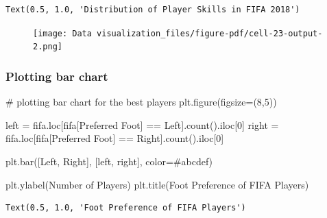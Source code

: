 \documentclass[
  letterpaper,
  DIV=11,
  numbers=noendperiod]{scrreprt}
\newenvironment{Shaded}{\begin{snugshade}}{\end{snugshade}}
\newcommand{\CommentTok}[1]{\textcolor[rgb]{0.37,0.37,0.37}{#1}}
\newcommand{\DecValTok}[1]{\textcolor[rgb]{0.68,0.00,0.00}{#1}}
\newcommand{\NormalTok}[1]{\textcolor[rgb]{0.00,0.23,0.31}{#1}}
\newcommand{\OperatorTok}[1]{\textcolor[rgb]{0.37,0.37,0.37}{#1}}
\newcommand{\StringTok}[1]{\textcolor[rgb]{0.13,0.47,0.30}{#1}}
\begin{document}
\begin{verbatim}
Text(0.5, 1.0, 'Distribution of Player Skills in FIFA 2018')
\end{verbatim}

\begin{figure}[H]

{\centering \texttt{[image: Data visualization\_files/figure-pdf/cell-23-output-2.png]}

}

\end{figure}

\hypertarget{plotting-bar-chart}{%
\subsubsection{Plotting bar chart}\label{plotting-bar-chart}}

\begin{Shaded}
\begin{Highlighting}[]
\CommentTok{\# plotting bar chart for the best players}
\NormalTok{plt.figure(figsize}\OperatorTok{=}\NormalTok{(}\DecValTok{8}\NormalTok{,}\DecValTok{5}\NormalTok{))}

\NormalTok{left }\OperatorTok{=}\NormalTok{ fifa.loc[fifa[}\StringTok{\textquotesingle{}Preferred Foot\textquotesingle{}}\NormalTok{] }\OperatorTok{==} \StringTok{\textquotesingle{}Left\textquotesingle{}}\NormalTok{].count().iloc[}\DecValTok{0}\NormalTok{]}
\NormalTok{right }\OperatorTok{=}\NormalTok{ fifa.loc[fifa[}\StringTok{\textquotesingle{}Preferred Foot\textquotesingle{}}\NormalTok{] }\OperatorTok{==} \StringTok{\textquotesingle{}Right\textquotesingle{}}\NormalTok{].count().iloc[}\DecValTok{0}\NormalTok{]}

\NormalTok{plt.bar([}\StringTok{\textquotesingle{}Left\textquotesingle{}}\NormalTok{, }\StringTok{\textquotesingle{}Right\textquotesingle{}}\NormalTok{], [left, right], color}\OperatorTok{=}\StringTok{\textquotesingle{}\#abcdef\textquotesingle{}}\NormalTok{)}

\NormalTok{plt.ylabel(}\StringTok{\textquotesingle{}Number of Players\textquotesingle{}}\NormalTok{)}
\NormalTok{plt.title(}\StringTok{\textquotesingle{}Foot Preference of FIFA Players\textquotesingle{}}\NormalTok{)}
\end{Highlighting}
\end{Shaded}

\begin{verbatim}
Text(0.5, 1.0, 'Foot Preference of FIFA Players')
\end{verbatim}
\end{document}
